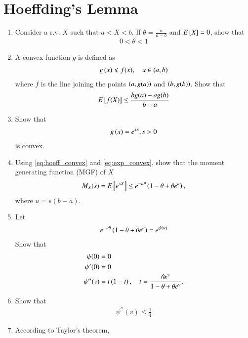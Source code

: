 \documentclass[journal,12pt,twocolumn]{IEEEtran}
\renewcommand\thesection{\arabic{section}}
\begin{document}
\section{Hoeffding's Lemma}
\begin{enumerate}[label=\thesection.\arabic*,ref=\thesection.\theenumi]
\item Consider a r.v. $X$ such that  $a < X < b$. If $\theta = \frac{a}{a-b}$ and $E{}\left[X\right] = 0$, show that 
\begin{align}
0 < \theta < 1
\end{align}
\item A convex function $g$ is defined as
\begin{align}
g\left(x\right) \leqslant f(x), \quad x \in \left(a,b\right)
\end{align}
where $f$ is the line joining the points $\left(a,g(a)\right)$ and $\left(b,g(b)\right)$.  Show that
\begin{align}
\label{eq:hoeff_convex}
E{}\left[f(X)\right] \le \frac{bg(a)- ag(b)}{b-a}
\end{align}
%
\item Show that 
\begin{align}
g\left(x\right) = e^{sx}, s > 0
\label{eq:exp_convex}
\end{align}
is convex.
\item Using \eqref{eq:hoeff_convex} and \eqref{eq:exp_convex}, show that the moment generating function (MGF) of $X$
\begin{align}
\label{eq:hoeff_mgf}
M_{X}(s) = E{}\left[e^{sX}\right]  \le e^{-u\theta}\left(1-\theta + \theta e^u\right),
\end{align}
%
where $u = s(b-a)$.
\item Let 
\begin{align}
\label{eq:hoeff_psi}
e^{-u\theta}\left(1-\theta + \theta e^u\right) = e^{\psi(u)}
\end{align}
Show that 
\begin{align}
\label{eq:hoeff_psi_der}
\psi(0) &= 0
\\
\psi^{\prime}(0) &= 0
\\
\psi^{\prime\prime}(v) &= t \left(1-t\right), \quad t = \frac{\theta e^{v}}{1 - \theta + \theta e^{v}}.
\end{align}
\item Show that 
\begin{align}
\label{eq:hoeff_psi_der2}
\psi^{\prime\prime}(v) \le \frac{1}{4}
\end{align}
\item According to Taylor's theorem,
\begin{align}

\end{align}
\end{enumerate}
\end{document}
